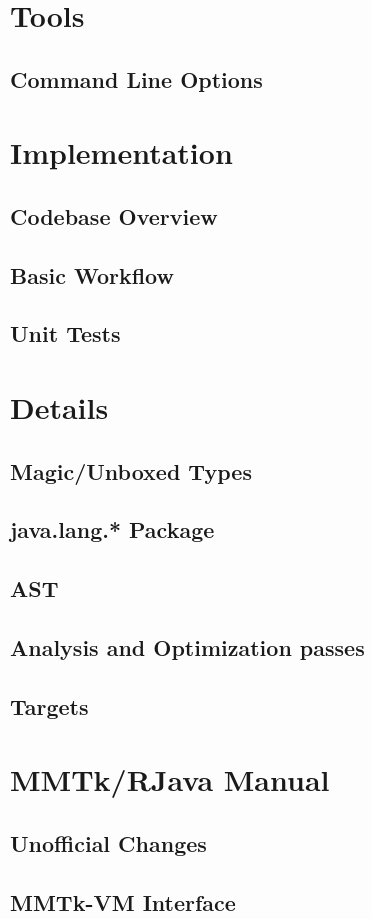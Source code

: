 \documentclass[12pt]{article}
\begin{document}
\section{\rjcfull Tools}

\subsection{Command Line Options}


\section{\rjcfull Implementation}

\subsection{Codebase Overview}
\subsection{Basic Workflow}
\subsection{Unit Tests}

\section{\rjcfull Details}

\subsection{Magic/Unboxed Types}
\subsection{java.lang.* Package}
\subsection{\rjcfull AST}
\subsection{Analysis and Optimization passes}
\subsection{\rjcfull Targets}

\section{MMTk/RJava Manual}

\subsection{Unofficial Changes}
\subsection{MMTk-VM Interface}
\end{document}
